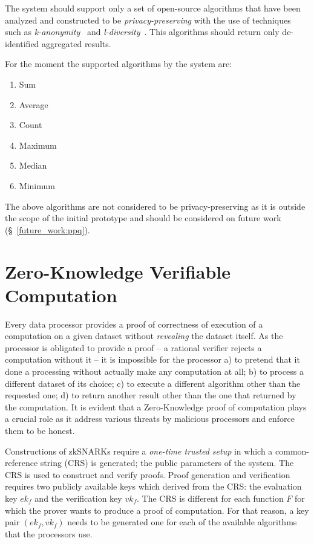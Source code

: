 The system should support only a set of open-source algorithms that have been analyzed and constructed to be  \textit{privacy-preserving} with the use of techniques such as \textit{k-anonymity}~\cite{Samarati98protectingprivacy} and \textit{l-diversity}~\cite{Aggarwal2008}. This algorithms should return only de-identified aggregated results.

For the moment the supported algorithms by the system are:

\begin{enumerate}
  \item Sum
  \item Average
  \item Count
  \item Maximum
  \item Median
  \item Minimum
\end{enumerate}

The above algorithms are not considered to be privacy-preserving as it is outside the scope of the initial prototype and should be considered on future work (§~\ref{future_work:ppq}).

\section{Zero-Knowledge Verifiable Computation}
\label{solution:proof}

Every data processor provides a proof of correctness of execution of a computation on a given dataset without \textit{revealing} the dataset itself. As the processor is obligated to provide a proof -- a rational verifier rejects a computation without it -- it is impossible for the processor a) to pretend that it done a processing without actually make any computation at all; b) to process a different dataset of its choice; c) to execute a different algorithm other than the requested one; d) to return another result other than the one that returned by the computation. It is evident that a Zero-Knowledge proof of computation plays a crucial role as it address various threats by malicious processors and enforce them to be honest.

Constructions of zkSNARKs require a \textit{one-time trusted setup} in which a common-reference string (CRS) is generated; the public parameters of the system. The CRS is used to construct and verify proofs. Proof generation and verification requires two publicly available keys which derived from the CRS: the evaluation key $ek_f$ and the verification key $vk_f$. The CRS is different for each function $F$ for which the prover wants to produce a proof of computation. For that reason, a key pair $(ek_f, vk_f)$ needs to be generated one for each of the available algorithms that the processors use.

